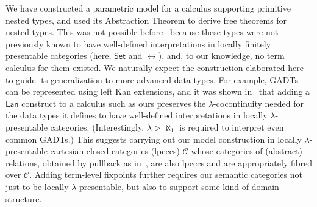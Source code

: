 \documentclass{lmcs}
\theoremstyle{plain}\newtheorem{satz}[thm]{Satz}
\newcommand{\cal}{\mathcal}
\newcommand{\set}{\mathsf{Set}}
\begin{document}
We have constructed a parametric model for a calculus supporting
primitive nested types, and used its Abstraction Theorem to derive
free theorems for nested types.  This was not possible
before~\cite{jp19} because these types were not previously known to
have well-defined interpretations in locally finitely presentable
categories (here, $\set$ and $\rel$), and, to our knowledge, no term
calculus for them existed.  We naturally expect the construction
elaborated here to guide its generalization to more advanced data
types.  For example, GADTs can be represented using left Kan
extensions, and it was shown in~\cite{jp19} that adding a
$\mathsf{Lan}$ construct to a calculus such as ours preserves the
$\lambda$-cocontinuity needed for the data types it defines to have
well-defined interpretations in locally $\lambda$-presentable
categories. (Interestingly, $\lambda > \aleph_1$ is required to
interpret even common GADTs.) This suggests carrying out our model
construction in locally $\lambda$-presentable cartesian closed
categories (lpcccs) $\cal C$ whose categories of (abstract) relations,
obtained by pullback as in~\cite{jac99}, are also lpcccs and are
appropriately fibred over $\cal C$.  Adding term-level fixpoints
further requires our semantic categories not just to be locally
$\lambda$-presentable, but also to support some kind of domain
structure.
\end{document}
